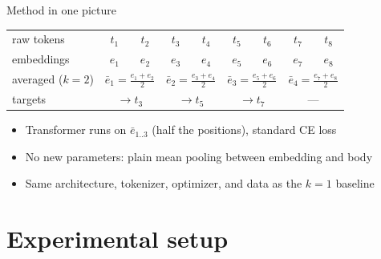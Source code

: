 \documentclass[10pt,aspectratio=169]{beamer}
\begin{document}
\begin{frame}{Method in one picture}
  \centering
  \begin{tabular}{lcccccccc}
    raw tokens        & $t_1$ & $t_2$ & $t_3$ & $t_4$ & $t_5$ & $t_6$ & $t_7$ & $t_8$ \\[2pt]
    embeddings        & $e_1$ & $e_2$ & $e_3$ & $e_4$ & $e_5$ & $e_6$ & $e_7$ & $e_8$ \\[6pt]
    averaged ($k{=}2$) & \multicolumn{2}{c}{$\bar e_1 = \frac{e_1+e_2}{2}$}
                      & \multicolumn{2}{c}{$\bar e_2 = \frac{e_3+e_4}{2}$}
                      & \multicolumn{2}{c}{$\bar e_3 = \frac{e_5+e_6}{2}$}
                      & \multicolumn{2}{c}{$\bar e_4 = \frac{e_7+e_8}{2}$} \\[6pt]
    targets           & \multicolumn{2}{c}{$\rightarrow t_3$}
                      & \multicolumn{2}{c}{$\rightarrow t_5$}
                      & \multicolumn{2}{c}{$\rightarrow t_7$}
                      & \multicolumn{2}{c}{---} \\
  \end{tabular}

  \vspace{1.2em}
  \begin{itemize}
    \item Transformer runs on $\bar e_{1..3}$ (half the positions), standard CE loss
    \item No new parameters: plain mean pooling between embedding and body
    \item Same architecture, tokenizer, optimizer, and data as the $k{=}1$ baseline
  \end{itemize}
\end{frame}

\section{Experimental setup}
\end{document}
